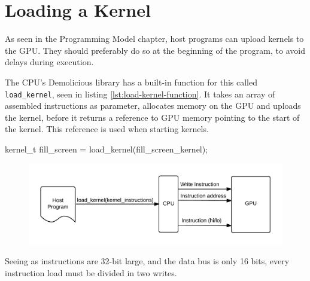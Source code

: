 \section{Loading a Kernel}
As seen in the Programming Model chapter, host programs can upload kernels to the GPU.
They should preferably do so at the beginning of the program, to avoid delays during execution.

The CPU's Demolicious library has a built-in function for this called \verb/load_kernel/, seen in listing \ref{lst:load-kernel-function}.
It takes an array of assembled instructions as parameter,
allocates memory on the GPU and uploads the kernel,
before it returns a reference to GPU memory pointing to the start of the kernel.
This reference is used when starting kernels.

\begin{c-code}[caption=A load\_kernel function call with the fillscreen kernel, label=lst:load-kernel-function]
kernel_t fill_screen = load_kernel(fill_screen_kernel);
\end{c-code}

\begin{figure}[H]
    \centering
    \includegraphics[width=\textwidth]{../cpu/diagrams/loading_a_kernel.png}
    \caption{}
    \label{fig:loading_a_kernel}
\end{figure}

Seeing as instructions are 32-bit large, and the data bus is only 16 bits,
every instruction load must be divided in two writes.
